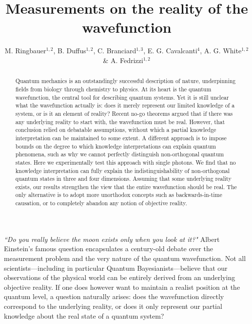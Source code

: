 \documentclass[aps,prl,floatfix,twocolumn,tightenlines,amsmath,amssymb,nofootinbib]{revtex4-1}
\begin{document}
\title{Measurements on the reality of the wavefunction}
\author{M. Ringbauer$^{1,2}$, B. Duffus$^{1,2}$, C. Branciard$^{1,3}$, E. G. Cavalcanti$^{4}$, A. G. White$^{1,2}$ \& A. Fedrizzi$^{1,2}$}


\begin{abstract}
Quantum mechanics is an outstandingly successful description of nature, underpinning fields from biology through chemistry to physics. At its heart is the quantum wavefunction, the central tool for describing quantum systems. Yet it is still unclear what the wavefunction actually is: does it merely represent our limited knowledge of a system, or is it an element of reality? Recent no-go theorems\cite{Pusey2012,Colbeck2011,hardy2013are,Patra2013no-,Aaronson2013,Colbeck2013} argued that if there was any underlying reality to start with, the wavefunction must be real. However, that conclusion relied on debatable assumptions, without which a partial knowledge interpretation can be maintained to some extent\cite{Lewis2012,Aaronson2013}. A different approach is to impose bounds on the degree to which knowledge interpretations can explain quantum phenomena, such as why we cannot perfectly distinguish non-orthogonal quantum states\cite{Barrett2014,Leifer2014,Branciard2014a}. Here we experimentally test this approach with single photons. We find that no knowledge interpretation can fully explain the indistinguishability of non-orthogonal quantum states in three and four dimensions. Assuming that some underlying reality exists, our results strengthen the view that the entire wavefunction should be real. The only alternative is to adopt more unorthodox concepts such as backwards-in-time causation, or to completely abandon any notion of objective reality.
\end{abstract}

\maketitle

\emph{``Do you really believe the moon exists only when you look at it?"} Albert Einstein's famous question encapsulates a century-old debate over the measurement problem and the very nature of the quantum wavefunction\cite{mermin1985moon}. Not all scientists---including in particular Quantum Bayesianists\cite{mermin2000QBism,caves2002quantum,Fuchs2010}---believe that our observations of the physical world can be entirely derived from an underlying objective reality. If one does however want to maintain a realist position at the quantum level, a question naturally arises: does the wavefunction directly correspond to the underlying reality, or does it only represent our partial knowledge about the real state of a quantum system?
\end{document}

